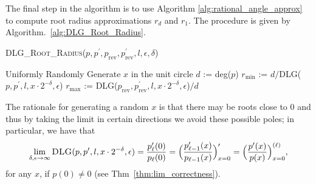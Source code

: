 \documentclass[sigconf]{acmart}
\begin{document}
The final step in the algorithm is to use Algorithm \ref{alg:rational_angle_approx} to compute root radius approximations $r_d$ and $r_1$.
The procedure is given by Algorithm.~\ref{alg:DLG_Root_Radius}.
\begin{algorithm}
\caption{\textsc{DLG\_Root\_Radius}($p,p^\prime,p_\mathrm{rev},p^\prime_\mathrm{rev},l, \epsilon, \delta $)}
\label{alg:DLG_Root_Radius}
\begin{algorithmic}
\STATE Uniformly Randomly Generate $x $ in the unit circle
\STATE $d$ := deg($p$)
\STATE $r_\mathrm{min} $ := $d/$\textsc{DLG}($p,p^\prime ,l,x\cdot 2^{-\delta}, \epsilon $)
\STATE $r_\mathrm{max} $ := \textsc{DLG}($p_\mathrm{rev},p^\prime _\mathrm{rev},l,x\cdot 2^{-\delta}, \epsilon$)$/d$
\end{algorithmic}
\end{algorithm}
The rationale for generating a random $x$ is that there may be roots close to 0 and thus by taking the limit in certain directions we avoid these possible poles; in particular, we have that
\begin{equation}
  \lim_{ \delta,\epsilon \to \infty }  \textsc{DLG}(p,p^\prime ,l,x\cdot 2^{-\delta}, \epsilon ) = \frac{p_{{\ell}}'(0)}{p_{\ell}(0)}=\Big(\frac{p_{\ell-1}'(x)}{p_{\ell-1}(x)}\Big)_{x=0}'=\Big(\frac{p'(x)}{p(x)}\Big)_{x=0}^{(\ell)},
\end{equation}
for any $x$, if $p(0) \neq 0$ (see Thm~\ref{thm:lim_correctness}).

\end{document}
